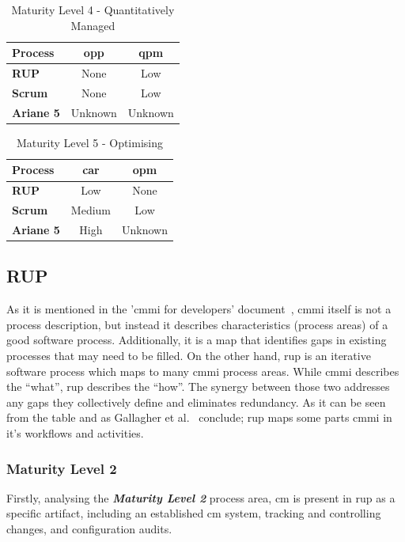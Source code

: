 \begin{table}[ht!]
    \centering
    \begin{tabular}{>{\bfseries}l|cc}
        Process & \acs{opp} & \acs{qpm} \\
        \midrule
        RUP     & None & Low \\   
        Scrum   & None & Low \\
        Ariane 5 & Unknown & Unknown \\
    \end{tabular}
    \caption{Maturity Level 4 - Quantitatively Managed}
    \label{tab:cmmi_l4}
\end{table}

\begin{table}[ht!]
    \centering
    \begin{tabular}{>{\bfseries}l|cc}
        Process & \acs{car} & \acs{opm} \\
        \midrule
        RUP     & Low & None \\
        Scrum   & Medium & Low \\
        Ariane 5 & High & Unknown \\
    \end{tabular}
    \caption{Maturity Level 5 - Optimising}
    \label{tab:cmmi_l5}
\end{table}


\FloatBarrier
\subsection{RUP}

As it is mentioned in the '\ac{cmmi} for developers' document~\citep{team2010cmmi}, \ac{cmmi} itself is not a process description, but instead it describes characteristics (process areas) of a good software process. Additionally, it is a map that identifies gaps in existing processes that may need to be filled. 
On the other hand, \ac{rup} is an iterative software process which maps to many \ac{cmmi} process areas. 
While \ac{cmmi} describes the ``what'', \ac{rup} describes the ``how''. 
The synergy between those two addresses any gaps they collectively define and eliminates redundancy. 
As it can be seen from the table and as Gallagher et al.~\citep{gallagher2001rational} conclude; \ac{rup} maps some parts \ac{cmmi} in it's workflows and activities.

\subsubsection{Maturity Level 2}
Firstly, analysing the \textbf{\textit{Maturity Level 2}} process area, \ac{cm} is present in \ac{rup} as a specific artifact, including an established \ac{cm} system, tracking and controlling changes, and configuration audits.

